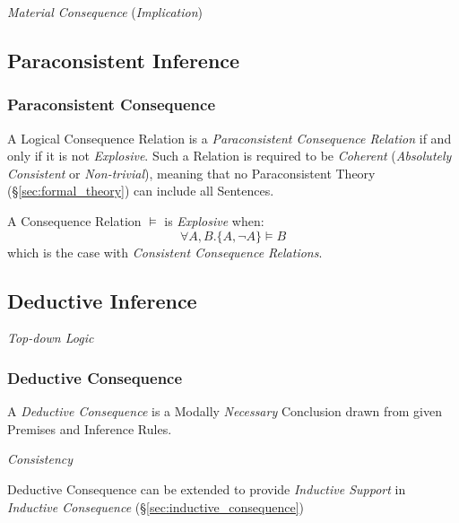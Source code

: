 \emph{Material Consequence} (\emph{Implication})



\subsection{Paraconsistent Inference}\label{sec:paraconsistent_inference}
\cite{priest-tanaka-weber13}

\subsubsection{Paraconsistent Consequence}\label{sec:paraconsistent_consequence}

A Logical Consequence Relation is a \emph{Paraconsistent Consequence
  Relation} if and only if it is not \emph{Explosive}. Such a Relation
is required to be \emph{Coherent} (\emph{Absolutely Consistent} or
\emph{Non-trivial}), meaning that no Paraconsistent Theory
(\S\ref{sec:formal_theory}) can include all Sentences.

A Consequence Relation $\vDash$ is \emph{Explosive} when:
\[
  \forall A, B. \{A, \neg A\} \vDash B
\]
which is the case with \emph{Consistent Consequence Relations}.



\subsection{Deductive Inference}\label{sec:deductive_inference}

\emph{Top-down Logic}

\subsubsection{Deductive Consequence}\label{sec:deductive_consequence}

A \emph{Deductive Consequence} is a Modally \emph{Necessary}
Conclusion drawn from given Premises and Inference Rules.

\emph{Consistency}

Deductive Consequence can be extended to provide \emph{Inductive
  Support} in \emph{Inductive Consequence}
(\S\ref{sec:inductive_consequence})




